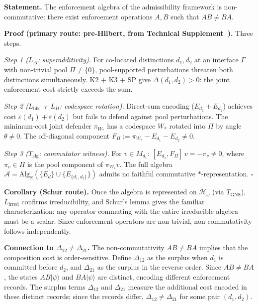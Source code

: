 \documentclass[11pt]{article}
\begin{document}
\begin{tcolorbox}[apfbox, title={Lemma $L_{\Delta\to\mathrm{nc}}$ (Interference Non-Closure Implies Non-Commutativity)}]
\textbf{Statement.}  The enforcement algebra of the admissibility framework is non-commutative: there exist enforcement operations $A, B$ such that $AB \ne BA$.

\smallskip\noindent\textbf{Proof (primary route: pre-Hilbert, from Technical Supplement~\cite{BrookeSupplement}).}  Three steps.

\textit{Step 1 ($L_\Delta$: superadditivity).}  For co-located distinctions $d_1, d_2$ at an interface $\Gamma$ with non-trivial pool $\Pi \ne \{0\}$, pool-supported perturbations threaten both distinctions simultaneously.  K2 + K3 + SP give $\Delta(d_1, d_2) > 0$: the joint enforcement cost strictly exceeds the sum.

\textit{Step 2 ($L_{\mathrm{blk}}$ + $L_\Pi$: codespace rotation).}  Direct-sum encoding ($E_{d_1} + E_{d_2}$) achieves cost $\varepsilon(d_1) + \varepsilon(d_2)$ but fails to defend against pool perturbations.  The minimum-cost joint defender $\pi_{W_*}$ has a codespace $W_*$ rotated into $\Pi$ by angle $\theta \ne 0$.  The off-diagonal component $F_\Pi := \pi_{W_*} - E_{d_1} - E_{d_2} \ne 0$.

\textit{Step 3 ($T_{\mathrm{alg}}$: commutator witness).}  For $v \in M_{d_1}$: $[E_{d_1}, F_\Pi]\,v = -\pi_v \ne 0$, where $\pi_v \in \Pi$ is the pool component of $\pi_{W_*} v$.  The full algebra $\mathcal{A} = \mathrm{Alg}_\mathbb{R}(\{E_d\} \cup \{E_{\{d_1,d_2\}}\})$ admits no faithful commutative $*$-representation.  $\square$

\smallskip\noindent\textbf{Corollary (Schur route).}  Once the algebra is represented on $\mathcal{H}_\omega$ (via $T_{\mathrm{GNS}}$), $L_{\mathrm{irred}}$ confirms irreducibility, and Schur's lemma gives the familiar characterization: any operator commuting with the entire irreducible algebra must be a scalar.  Since enforcement operators are non-trivial, non-commutativity follows independently.

\smallskip\noindent\textbf{Connection to $\Delta_{12} \ne \Delta_{21}$.}  The non-commutativity $AB \ne BA$ implies that the composition cost is order-sensitive.  Define $\Delta_{12}$ as the surplus when $d_1$ is committed before $d_2$, and $\Delta_{21}$ as the surplus in the reverse order.  Since $AB \ne BA$, the states $AB|\psi\rangle$ and $BA|\psi\rangle$ are distinct, encoding different enforcement records.  The surplus terms $\Delta_{12}$ and $\Delta_{21}$ measure the additional cost encoded in these distinct records; since the records differ, $\Delta_{12} \ne \Delta_{21}$ for some pair $(d_1, d_2)$.


\end{tcolorbox}
\end{document}
